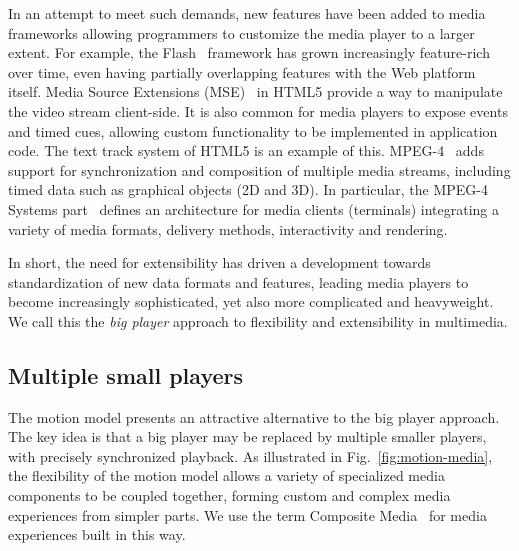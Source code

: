 \documentclass[graybox]{svmult}
\begin{document}
In an attempt to meet such demands, new features have been added to media
frameworks allowing programmers to customize the media player to a larger
extent. For example, the Flash~\cite{flash} framework has grown increasingly
feature-rich over time, even having partially overlapping features with the
Web platform itself. Media Source Extensions (MSE)~\cite{mse} in HTML5
provide a way to manipulate the video stream client-side. It is also common
for media players to expose events and timed cues, allowing custom
functionality to be implemented in application code. The text track system of
HTML5 is an example of this. MPEG-4~\cite{mpeg4} adds support for
synchronization and composition of multiple media streams, including timed data
such as graphical objects (2D and 3D). In particular, the MPEG-4 Systems
part~\cite{mpeg4sys} defines an architecture for media clients (terminals)
integrating a variety of media formats, delivery methods, interactivity and
rendering.

In short, the need for extensibility has driven a development towards
standardization of new data formats and features, leading media players to
become increasingly sophisticated, yet also more complicated and heavyweight.
We call this the \emph{big player} approach to flexibility and extensibility in
multimedia.


\subsection{Multiple small players}

The motion model presents an attractive alternative to the big player
approach. The key idea is that a big player may be replaced by multiple
smaller players, with precisely synchronized playback. As illustrated in
Fig.~\ref{fig:motion-media}, the flexibility of the motion model allows a
variety of specialized media components to be coupled together, forming custom
and complex media experiences from simpler parts. We use the term Composite
Media~\cite{compositemedia} for media experiences built in this way.
\end{document}
